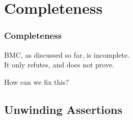 
\section{Completeness}

\begin{frame}
\frametitle{Completeness}

BMC, as discussed so far, is incomplete.\\
It only refutes, and does not
prove.
\vfill

How can we fix this?

\end{frame}

\subsection{Unwinding Assertions}

